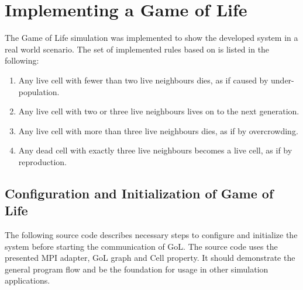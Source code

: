 
\section{Implementing a Game of Life}
\label{sec:impl:gol}
The Game of Life simulation was implemented to show the developed
system in a real world scenario. The set of implemented rules based on
\cite{ref:gol_rules} is listed in the following:

\begin{enumerate}
\item Any live cell with fewer than two live neighbours dies, as if caused by under-population.
\item Any live cell with two or three live neighbours lives on to the next generation.
\item Any live cell with more than three live neighbours dies, as if by overcrowding.
\item Any dead cell with exactly three live neighbours becomes a live cell, as if by reproduction.
\end{enumerate}

\subsection{Configuration and Initialization of Game of Life}
The following source code describes necessary steps to configure and
initialize the system before starting the communication of GoL. The
source code uses the presented MPI adapter, GoL graph and
Cell property. It should demonstrate the general program flow and be
the foundation for usage in other simulation applications.

